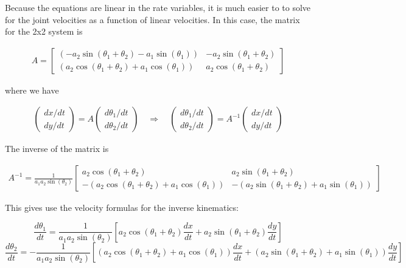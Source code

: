 Because the equations are linear in the rate variables, it is much
easier to to solve for the joint velocities as a function of linear
velocities. In this case, the matrix for the 2x2 system is

\[\begin{aligned}
A = \begin{bmatrix}
\left( -a_2\sin (\theta_1+\theta_2) -  a_1 \sin (\theta_1) \right) & -a_2\sin (\theta_1+\theta_2) \\
\left( a_2\cos (\theta_1+\theta_2) +  a_1 \cos (\theta_1) \right)  & a_2\cos (\theta_1+\theta_2)
\end{bmatrix}
\end{aligned}\]

where we have

\[\begin{aligned}
\begin{pmatrix} dx/dt\\  dy/dt \end{pmatrix} = A \begin{pmatrix} d\theta_1/dt \\ d\theta_2/dt \end{pmatrix}
\quad \Rightarrow \quad
\begin{pmatrix} d\theta_1/dt \\ d\theta_2/dt \end{pmatrix} = A^{-1} \begin{pmatrix} dx/dt\\  dy/dt \end{pmatrix}
\end{aligned}\]

The inverse of the matrix is

\[\begin{aligned}
A^{-1} = \frac{1}{a_1a_2\sin(\theta_2)}
\begin{bmatrix}
 a_2\cos (\theta_1+\theta_2) & a_2\sin (\theta_1+\theta_2) \\
- \left( a_2\cos (\theta_1+\theta_2) +  a_1 \cos (\theta_1) \right)  &
-\left(a_2\sin (\theta_1+\theta_2) +  a_1 \sin (\theta_1) \right)
\end{bmatrix}
\end{aligned}\]

This gives use the velocity formulas for the inverse kinematics:

\[\frac{d\theta_1}{dt} = \frac{1}{a_1a_2\sin(\theta_2)} \left[  a_2\cos (\theta_1+\theta_2) \frac{dx}{dt}
+ a_2\sin (\theta_1+\theta_2) \frac{dy}{dt} \right]\]\[\frac{d\theta_2}{dt} = - \frac{1}{a_1a_2\sin(\theta_2)} \left[  \left( a_2\cos (\theta_1+\theta_2) +  a_1 \cos (\theta_1) \right)  \frac{dx}{dt} +
\left(a_2\sin (\theta_1+\theta_2) +  a_1 \sin (\theta_1) \right) \frac{dy}{dt} \right]\]

